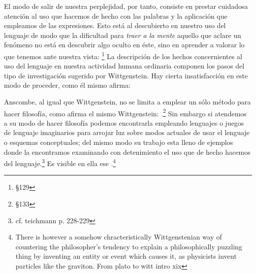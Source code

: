El modo de salir de nuestra perplejidad, por tanto, consiste en prestar
cuidadosa atención al uso que hacemos de hecho con las palabras y la aplicación
que empleamos de las expresiones. Esto está al descubierto en nuestro uso del
lenguaje de modo que la dificultad para \emph{traer a la mente} aquello que
aclare un fenómeno no está en descubrir algo oculto en éste, sino en aprender a
valorar lo que tenemos ante nuestra vista: \footnote{\S129} La descripción de los hechos
concernientes al uso del lenguaje en nuestra actividad humana ordinaria componen
los pasos del tipo de investigación sugerido por Wittgenstein. Hay cierta
insatisfacción en este modo de proceder, como él mismo afirma: 

Anscombe, al igual que Wittgenstein, no se limita a emplear un sólo método para
hacer filosofía, como afirma el mismo Wittgenstein: .\footnote{\S133} Sin embargo si atendemos a su modo de
hacer filosofía podemos encontrarla empleando lenguajes o juegos de lenguaje
imaginarios para arrojar luz sobre modos actuales de usar el lenguaje o esquemas
conceptuales; del mismo modo su trabajo esta lleno de ejemplos donde la
encontramos examinando con detenimiento el uso que de hecho hacemos del
lenguaje.\footnote{cf. teichmann p. 228-229} Es visible en ella ese
.\footnote{There is however a somehow
  chracteristically Wittgenstenian way of countering the philosopher's tendency
  to explain a philosophically puzzling thing by inventing an entity or event
  which causes it, as physicists invent particles like the graviton. From plato
  to witt intro xix}

